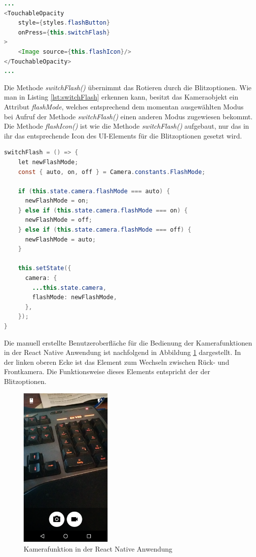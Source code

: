 \begin{lstlisting}[caption=Initialisierung des UI-Elements zum Wechseln des Blitzmodus, label=lst:FlashSwitchElement, language=Java]
...
<TouchableOpacity
	style={styles.flashButton}
    onPress={this.switchFlash}
>
    <Image source={this.flashIcon}/>
</TouchableOpacity>
...
\end{lstlisting}

Die Methode \textit{switchFlash()} übernimmt das Rotieren durch die Blitzoptionen. Wie man in Listing \ref{lst:switchFlash} erkennen kann, besitzt das Kameraobjekt ein Attribut \textit{flashMode}, welches entsprechend dem momentan ausgewählten Modus bei Aufruf der Methode \textit{switchFlash()} einen anderen Modus zugewiesen bekommt. Die Methode \textit{flashIcon()} ist wie die Methode \textit{switchFlash()} aufgebaut, nur das in ihr das entsprechende Icon des UI-Elements für die Blitzoptionen gesetzt wird.
\clearpage

\begin{lstlisting}[caption=Die Methode \textit{switchFlash()} für das Ändern des Blitzmodus, label=lst:switchFlash, language=Java]
switchFlash = () => {
    let newFlashMode;
    const { auto, on, off } = Camera.constants.FlashMode;

    if (this.state.camera.flashMode === auto) {
      newFlashMode = on;
    } else if (this.state.camera.flashMode === on) {
      newFlashMode = off;
    } else if (this.state.camera.flashMode === off) {
      newFlashMode = auto;
    }

    this.setState({
      camera: {
        ...this.state.camera,
        flashMode: newFlashMode,
      },
    });
}
\end{lstlisting}

Die manuell erstellte Benutzeroberfläche für die Bedienung der Kamerafunktionen in der React Native Anwendung ist nachfolgend in Abbildung \ref{fig:KameraReact} dargestellt. In der linken oberen Ecke ist das Element zum Wechseln zwischen Rück- und Frontkamera. Die Funktionsweise dieses Elements entspricht der der Blitzoptionen. 
\clearpage

\begin{figure}[h]
	\centering
	\includegraphics[width=0.4\textwidth]{Bilder/Screenshot_20170412-213200.PNG}
	\caption{Kamerafunktion in der React Native Anwendung}
	\label{fig:KameraReact}
\end{figure}

